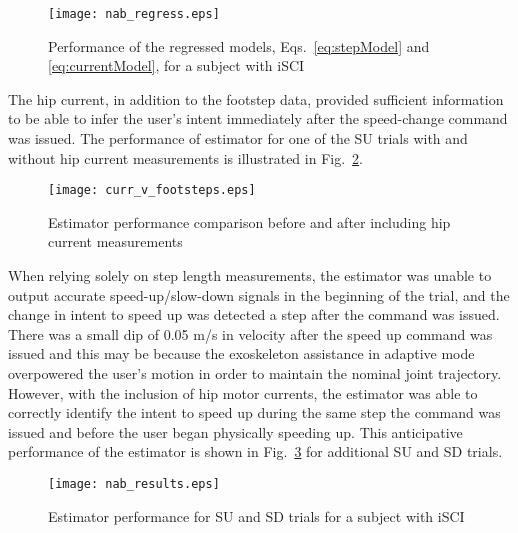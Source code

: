 \begin{figure}
	\centering
	\texttt{[image: nab\_regress.eps]}
	\caption{Performance of the regressed models, Eqs.~\eqref{eq:stepModel} and \eqref{eq:currentModel}, for a subject with iSCI} \label{fig:nab_regressor}
\end{figure}

The hip current, in addition to the footstep data, provided sufficient information to be able to infer the user's intent immediately after the speed-change command was issued. The performance of estimator for one of the SU trials with and without hip current measurements is illustrated in Fig.~\ref{fig:c_v_f}. 

\begin{figure}
	\centering
	\texttt{[image: curr\_v\_footsteps.eps]}
	\caption{Estimator performance comparison before and after including hip current measurements} \label{fig:c_v_f}
\end{figure}

When relying solely on step length measurements, the estimator was unable to output accurate speed-up/slow-down signals in the beginning of the trial, and the change in intent to speed up was detected a step after the command was issued. There was a small dip of 0.05 m/s in velocity after the speed up command was issued and this may be because the exoskeleton assistance in adaptive mode overpowered the user's motion in order to maintain the nominal joint trajectory. However, with the inclusion of hip motor currents, the estimator was able to correctly identify the intent to speed up during the same step the command was issued and before the user began physically speeding up. This anticipative performance of the estimator is shown in Fig.~\ref{fig:nab_results} for additional SU and SD trials.
 
\begin{figure}
	\centering
	\texttt{[image: nab\_results.eps]}
	\caption{Estimator performance for SU and SD trials for a subject with iSCI} \label{fig:nab_results}
	\vspace{-1em}
\end{figure}

